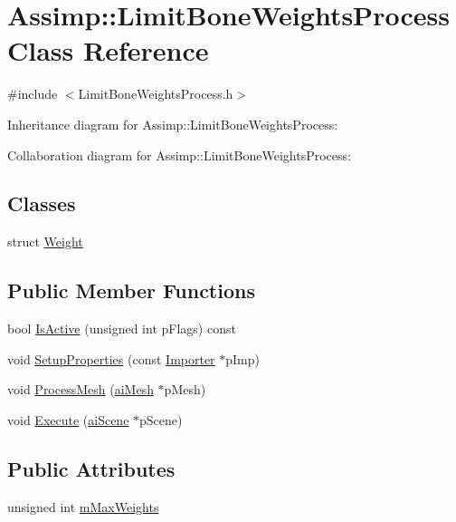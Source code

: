 \hypertarget{class_assimp_1_1_limit_bone_weights_process}{\section{Assimp\+:\+:Limit\+Bone\+Weights\+Process Class Reference}
\label{class_assimp_1_1_limit_bone_weights_process}
}


{\ttfamily \#include $<$Limit\+Bone\+Weights\+Process.\+h$>$}



Inheritance diagram for Assimp\+:\+:Limit\+Bone\+Weights\+Process\+:


Collaboration diagram for Assimp\+:\+:Limit\+Bone\+Weights\+Process\+:
\subsection*{Classes}
\begin{DoxyCompactItemize}
\item 
struct \hyperlink{struct_assimp_1_1_limit_bone_weights_process_1_1_weight}{Weight}
\end{DoxyCompactItemize}
\subsection*{Public Member Functions}
\begin{DoxyCompactItemize}
\item 
bool \hyperlink{class_assimp_1_1_limit_bone_weights_process_a7f52eb37fa98db95fdf531e465e39508}{Is\+Active} (unsigned int p\+Flags) const 
\item 
void \hyperlink{class_assimp_1_1_limit_bone_weights_process_a979319b353bc0a8dcc0b383ac1b1c40c}{Setup\+Properties} (const \hyperlink{class_assimp_1_1_importer}{Importer} $\ast$p\+Imp)
\item 
void \hyperlink{class_assimp_1_1_limit_bone_weights_process_a92ff3537a58ca89aef31aecf6bd03acc}{Process\+Mesh} (\hyperlink{structai_mesh}{ai\+Mesh} $\ast$p\+Mesh)
\item 
void \hyperlink{class_assimp_1_1_limit_bone_weights_process_a9d959d9d9626bef3046ce69a517db0c3}{Execute} (\hyperlink{structai_scene}{ai\+Scene} $\ast$p\+Scene)
\end{DoxyCompactItemize}
\subsection*{Public Attributes}
\begin{DoxyCompactItemize}
\item 
unsigned int \hyperlink{class_assimp_1_1_limit_bone_weights_process_a3bc590dff2744a563bb5219270b518a6}{m\+Max\+Weights}
\end{DoxyCompactItemize}

